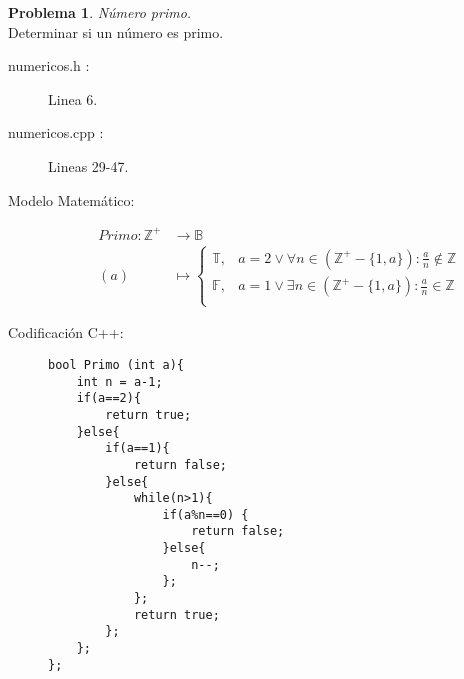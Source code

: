 \documentclass{article}
\theoremstyle{plain}
\theoremstyle{definition}
\newtheorem{problem}{Problema}
\begin{document}
\begin{problem} \emph{Número primo.}\\
\hspace*{7mm}Determinar si un número es primo.
%
\begin{description}
\item[numericos.h :] Linea 6. \item[numericos.cpp :] Lineas 29-47.

\item[Modelo Matemático:]
\begin{align*}
Primo: \mathbb{Z^{+}} &\to \mathbb{B}\\
(a) &\mapsto \begin{cases}
\mathbb{T},& a=2\vee \forall n \in \left(\mathbb{Z^{+}}-\lbrace{1,a}\rbrace\right):\frac{a}{n} \not\in \mathbb{Z}\\
\mathbb{F},& a=1\vee \exists n \in \left(\mathbb{Z^{+}}-\lbrace{1,a}\rbrace\right):\frac{a}{n} \in \mathbb{Z}\\
\end{cases}
\end{align*}
%
\item[Codificación \textsf{C++}:]\hfill
%
\begin{verbatim}
bool Primo (int a){
    int n = a-1;
    if(a==2){
        return true;
    }else{
        if(a==1){
            return false;
        }else{
            while(n>1){
                if(a%n==0) {
                    return false;
                }else{
                    n--;
                };
            };
            return true;
        };
    };
};
\end{verbatim}
\end{description}
\end{problem}
\end{document}
